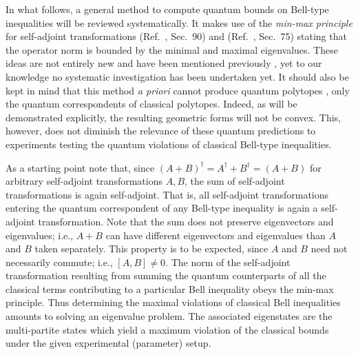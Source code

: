 \documentclass[prl,showpacs,showkeys,amsfonts,amsmath,twocolumn]{revtex4}
\begin{document}
In what follows,
a general method to compute quantum bounds on Bell-type inequalities
will be reviewed systematically.
It makes use of the {\em min-max principle} for self-adjoint transformations
(Ref.~\cite{halmos-vs}, Sec.~90) and (Ref.~\cite{reed-sim4}, Sec.~75)
stating that the operator norm is bounded by the minimal and maximal eigenvalues.
These ideas are not entirely new and have been mentioned previously
\cite{werner-wolf-2001,filipp-svo-04-qpoly,cabello-2003a},
yet to our knowledge no systematic investigation has been undertaken yet.
It should also be kept in mind that this method {\it a priori}
cannot produce quantum polytopes \cite{pit:range-2001,filipp-svo-04-qpoly},
only the quantum correspondents of classical polytopes.
Indeed, as will be demonstrated explicitly, the resulting geometric forms will not be convex.
This, however,
does not diminish the relevance of these quantum predictions
to experiments testing the quantum violations
of classical Bell-type inequalities.

As a starting point note that,
since $(A+B)^\dagger =A^\dagger +B^\dagger = (A+B)$ for arbitrary self-adjoint transformations $A,B$,
the sum of self-adjoint transformations is again self-adjoint.
That is, all self-adjoint transformations entering the quantum correspondent of any Bell-type inequality
is again a self-adjoint transformation.
Note that the sum does not preserve eigenvectors and eigenvalues;
i.e., $A+B$ can have different eigenvectors and eigenvalues than $A$ and $B$ taken separately.
This property is to be expected, since $A$ and $B$ need not necessarily commute;
i.e., $[A,B]\neq 0$.
The norm of the self-adjoint transformation resulting from summing the quantum counterparts
of all the classical terms contributing to a particular Bell inequality obeys the min-max principle.
Thus determining the maximal violations of classical Bell inequalities amounts to
solving an eigenvalue problem.
The associated eigenstates are the multi-partite states which yield a maximum violation
of the classical bounds under the given experimental (parameter) setup.
\end{document}
